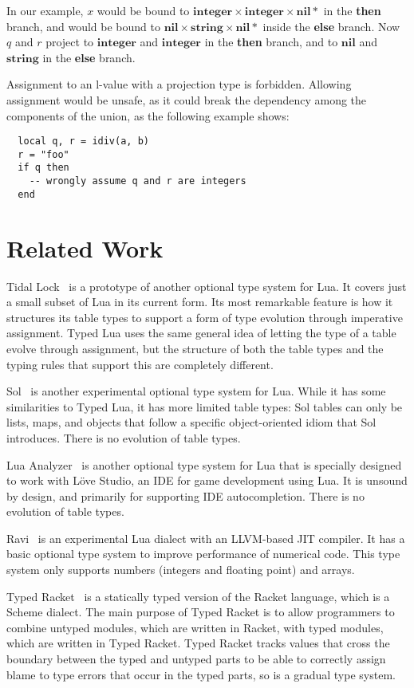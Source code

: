 \documentclass{sigplanconf}
\newcommand{\Nil}{\mathbf{nil}}
\newcommand{\Integer}{\mathbf{integer}}
\newcommand{\String}{\mathbf{string}}
\begin{document}
In our example, $x$ would be bound to $\Integer \times \Integer \times \Nil{*}$ in the {\bf then} branch, and would be bound
to $\Nil \times \String \times \Nil{*}$ inside the {\bf else}
branch. Now $q$ and $r$ project to $\Integer$ and $\Integer$
in the {\bf then} branch, and to $\Nil$ and $\String$ in the
{\bf else} branch. 

Assignment to an l-value with a projection type is forbidden. Allowing assignment
would be unsafe, as it could break the dependency among the
components of the union, as the following example shows:
\begin{verbatim}
  local q, r = idiv(a, b)
  r = "foo"
  if q then
    -- wrongly assume q and r are integers
  end
\end{verbatim}

\section{Related Work}
\label{sec:related}

Tidal Lock~\cite{tidallock} is a prototype of another optional type system for Lua. It covers just a small subset of Lua
in its current form. Its most remarkable feature is
how it structures its table types to support a form of type
evolution through imperative assignment. Typed Lua uses
the same general idea of letting the type of a table evolve
through assignment, but the structure of both the table types
and the typing rules that support this are completely different.

Sol~\cite{sol} is another experimental optional type system
for Lua. While it has some similarities to Typed Lua, it
has more limited table types: Sol tables can only be lists,
maps, and objects that follow a specific object-oriented
idiom that Sol introduces. There is no evolution of table
types.

Lua Analyzer~\cite{luaanalyzer} is another optional type
system for Lua that is specially designed to work with
Löve Studio, an IDE for game development using Lua.
It is unsound by design, and primarily for supporting
IDE autocompletion. There is no evolution of table types.

Ravi~\cite{ravi} is an experimental Lua dialect
with an LLVM-based JIT compiler. It has a basic
optional type system to improve performance
of numerical code. This type system only supports
numbers (integers and floating point) and arrays.

Typed Racket~\cite{tobin-hochstadt2008ts} is a statically typed version of the Racket language, which is a Scheme dialect.
The main purpose of Typed Racket is to allow programmers to combine untyped modules, which are written in Racket, with typed modules, which are written in Typed Racket. Typed Racket tracks
values that cross the boundary between the typed and
untyped parts to be able to correctly assign blame to type
errors that occur in the typed parts, so is a gradual type
system.
\end{document}
